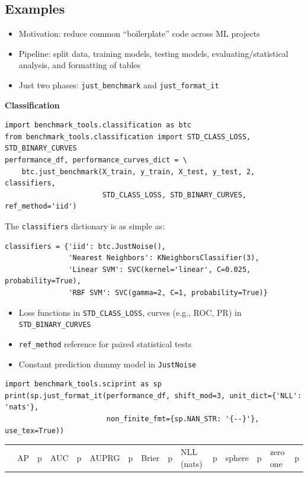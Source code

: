 \documentclass[a0,landscape]{a0poster}
\newcommand{\mysection}[1]{\section*{\fontsize{67.1}{82} \selectfont \color{NavyBlue} #1 \color{Black}}}
\newcommand{\code}{\texttt}
\newcommand{\sectionx}{\textbf}
\begin{document}
\begin{multicols}{2}

\mysection{Examples}

\begin{itemize}
  \item Motivation: reduce common ``boilerplate'' code across ML projects
  \item Pipeline: split data, training models, testing models, evaluating/statistical analysis, and formatting of tables
  \item Just two phases: \code{just\_benchmark} and \code{just\_format\_it}
\end{itemize}

\sectionx{Classification}
\begin{verbatim}
import benchmark_tools.classification as btc
from benchmark_tools.classification import STD_CLASS_LOSS, STD_BINARY_CURVES
performance_df, performance_curves_dict = \
    btc.just_benchmark(X_train, y_train, X_test, y_test, 2, classifiers,
                       STD_CLASS_LOSS, STD_BINARY_CURVES, ref_method='iid')
\end{verbatim}
The \code{classifiers} dictionary is as simple as:
\begin{verbatim}
classifiers = {'iid': btc.JustNoise(),
               'Nearest Neighbors': KNeighborsClassifier(3),
               'Linear SVM': SVC(kernel='linear', C=0.025, probability=True),
               'RBF SVM': SVC(gamma=2, C=1, probability=True)}
\end{verbatim}
\begin{itemize}
  \item Loss functions in \code{STD\_CLASS\_LOSS}, curves (e.g., ROC, PR) in \code{STD\_BINARY\_CURVES}
  \item \code{ref\_method} reference for paired statistical tests
  \item Constant prediction dummy model in \code{JustNoise}
\end{itemize}
\begin{verbatim}
import benchmark_tools.sciprint as sp
print(sp.just_format_it(performance_df, shift_mod=3, unit_dict={'NLL': 'nats'},
                        non_finite_fmt={sp.NAN_STR: '{--}'}, use_tex=True))
\end{verbatim}
%
\begin{center}
{\footnotesize
\setlength{\tabcolsep}{0.75em} %
\begin{tabular}{|l|l|r|l|r|l|r|l|r|l|r|l|r|l|r|}
\toprule
{}                &       {AP} &      {p} &      {AUC} &      {p} &  {AUPRG} &      {p} &    {Brier} &      {p} & {NLL (nats)} &      {p} &   {sphere} &      {p} & {zero one} &      {p} \\

\end{tabular}}
\end{center}
\end{multicols}
\end{document}
